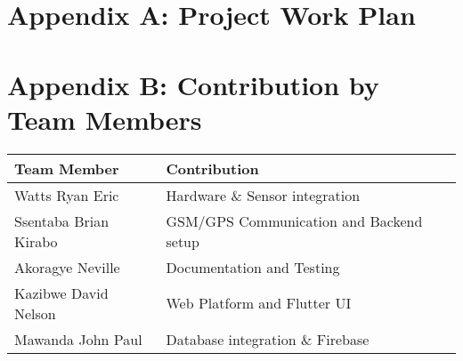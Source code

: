 \documentclass[12pt]{article}
\begin{document}
\section*{Appendix A: Project Work Plan}

\section*{Appendix B: Contribution by Team Members}
\begin{longtable}{@{}ll@{}}
\toprule
\textbf{Team Member} & \textbf{Contribution} \\
\midrule
Watts Ryan Eric & Hardware \& Sensor integration \\
Ssentaba Brian Kirabo & GSM/GPS Communication and Backend setup \\
Akoragye Neville & Documentation and Testing \\
Kazibwe David Nelson & Web Platform and Flutter UI \\
Mawanda John Paul & Database integration \& Firebase \\
\bottomrule
\end{longtable}
\end{document}
